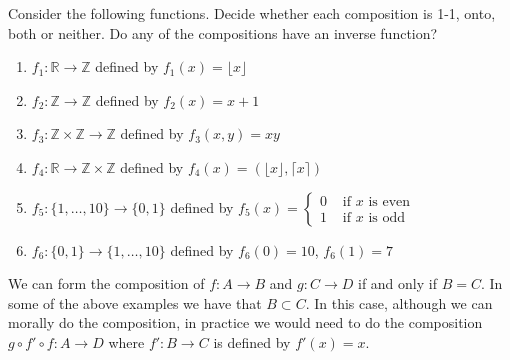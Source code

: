 \documentclass[11pt,dvipsnames]{book}
\def\R{\mathbb{R}}
\def\Z{\mathbb{Z}}
\numberwithin{equation}{section} %
\numberwithin{figure}{section} %
\numberwithin{table}{section} %
\begin{document}
\begin{exercise}
 Consider the following functions. Decide whether each composition is 1-1, onto, both or neither. Do any of the compositions have an inverse function?

\begin{enumerate}[label=(\alph*)]
\item $f_1 \colon \R \to \Z$ defined by $f_1(x) = \lfloor x \rfloor$
\item $f_2 \colon \Z \to \Z$ defined by $f_2(x) = x+1$
\item $f_3 \colon \Z \times \Z \to \Z$ defined by $f_3(x,y) = xy$
\item $f_4 \colon \R \to \Z \times \Z$ defined by $f_4(x) = (\lfloor x \rfloor, \lceil x \rceil)$
\item $f_5 \colon \{ 1,\dots,10\} \to \{0,1\}$ defined by $f_5(x) = \begin{cases} 0 & \text{ if }x \text{ is even} \\1 & \text{ if }x \text{ is odd} \end{cases}$
\item $f_6 \colon \{0,1\} \to \{ 1,\dots,10\}$ defined by $f_6(0) = 10$, $f_6(1) = 7$
\end{enumerate}

\begin{solution}
We can form the composition of $f \colon A \to B$ and $g \colon C \to D$ if and only if $B=C$. In some of the above examples we have that $B \subset C$. In this case, although we can morally do the composition, in practice we would need to do the composition $g \circ f' \circ f \colon A \to D$ where $f' \colon B \to C$ is defined by $f'(x)=x$.


\end{solution}
\end{exercise}
\end{document}
